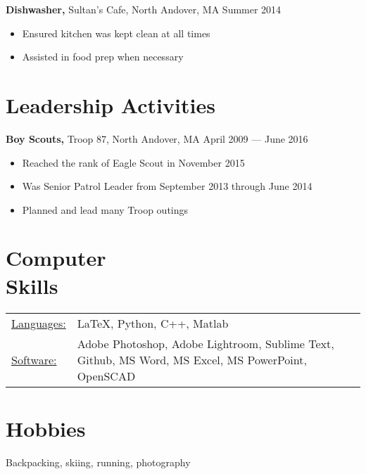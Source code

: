 \documentclass[margin]{res}
\begin{document}
\begin{resume}
	{\bf Dishwasher,} Sultan's Cafe, North Andover, MA \hfill Summer 2014
	\begin{itemize} \itemsep -2pt
		\item Ensured kitchen was kept clean at all times
		\item Assisted in food prep when necessary
	\end{itemize}
	
	\section{Leadership Activities} 
	{\bf Boy Scouts,} Troop 87, North Andover, MA \hfill April 2009 --- June 2016
	\begin{itemize} \itemsep -2pt
		\item Reached the rank of Eagle Scout in November 2015
		\item Was Senior Patrol Leader from September 2013 through June 2014
		\item Planned and lead many Troop outings
	\end{itemize}
	
	\section{Computer \\ Skills}
	\begin{tabular}{l p{3.5in}}
		\underline{Languages:} & \LaTeX, Python, C++, Matlab \\
		
		\underline{Software:}  & Adobe Photoshop, Adobe Lightroom, Sublime Text, Github, MS Word, MS Excel, MS PowerPoint, OpenSCAD
	\end{tabular}

	\section{Hobbies}
	Backpacking, skiing, running, photography
	
\end{resume} 
\end{document}
